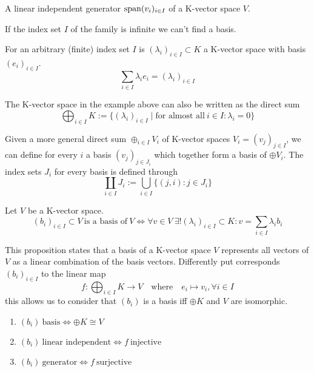 \begin{definition}[Basis]\label{def:basis}
   A linear independent generator \(\operatorname{span}(v_i)_{i \in I}\) of a K-vector space \(V\).
\end{definition}
\begin{remark}
   If the index set \(I\) of the family is infinite we can't find a basis.
\end{remark}
\begin{example}
   For an arbitrary (finite) index set \(I\) is \((\lambda_i)_{i \in I} \subset K\) a K-vector space with basis \((e_i)_{i \in I}\).
   \[\sum_{i \in I} \lambda_i e_i = (\lambda_i)_{i \in I}\]
\end{example}
\begin{remark}
   The K-vector space in the example above can also be written as the direct sum
   \[\bigoplus_{i \in I} K := \{(\lambda_i)_{i \in I} \mid \text{for almost all}~i \in I: \lambda_i = 0\}\]

   Given a more general direct sum \(\oplus_{i \in I} V_i\) of K-vector spaces \(V_i = (v_j)_{j \in I}\), we can define for every \(i\) a basis \((v_j)_{j \in J_i}\) which together form a basis of \(\oplus V_i\).
   The index sets \(J_i\) for every basis is defined through
   \[\coprod_{i \in I} J_i := \bigcup_{i \in I} \{(j, i): j \in J_i\}\]
\end{remark}

\begin{proposition}
   Let \(V\) be a K-vector space.
   \[(b_i)_{i \in I} \subset V~\text{is a basis of}~V \iff \forall v \in V~\exists! (\lambda_i)_{i \in I} \subset K: v = \sum_{i \in I} \lambda_i b_i\]
\end{proposition}
\begin{remark}
   This proposition states that a basis of a K-vector space \(V\) represents all vectors of \(V\) as a linear combination of the basis vectors.
   Differently put corresponds \((b_i)_{i \in I}\) to the linear map
   \[f: \bigoplus_{i \in I} K \to V \quad\text{where}\quad e_i \mapsto v_i, \forall i \in I\]
   this allows us to consider that \((b_i)\) is a basis iff \(\oplus K\) and \(V\) are isomorphic.
   \begin{enumerate}
      \item \((b_i)~\text{basis} \iff \oplus K \cong V\)
      \item \((b_i)~\text{linear independent} \iff f~\text{injective}\)
      \item \((b_i)~\text{generator} \iff f~\text{surjective}\)
   \end{enumerate}
\end{remark}

